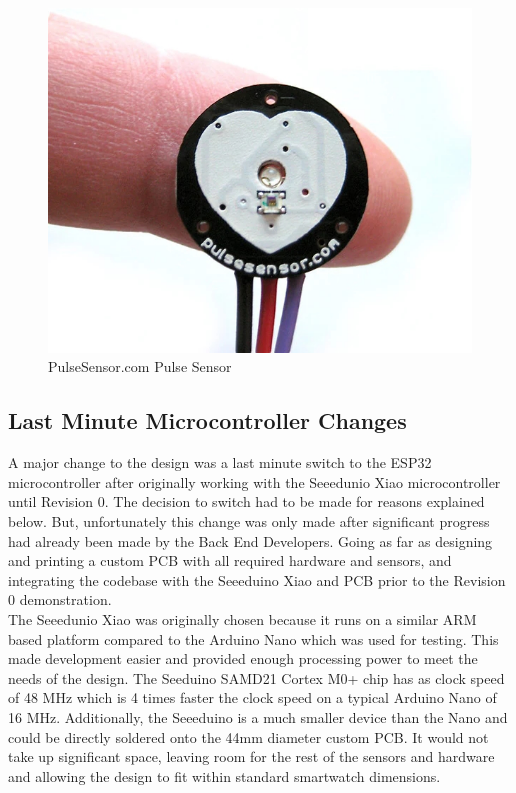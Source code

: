 \documentclass[12pt, titlepage]{article}
\begin{document}
\begin{figure}[H]
\centering
\includegraphics[scale = 0.5]{pulseSensor}
  \caption{PulseSensor.com Pulse Sensor}
  \label{fig:pulseSensor}
\end{figure}


\subsection{Last Minute Microcontroller Changes}\label{microcontroller_change}

A major change to the design was a last minute switch to the ESP32 microcontroller after originally working with the Seeedunio Xiao microcontroller until Revision 0. The decision to switch had to be made for reasons explained below. But, unfortunately this change was only made after significant progress had already been made by the Back End Developers. Going as far as designing and printing a custom PCB with all required hardware and sensors, and integrating the codebase with the Seeeduino Xiao and PCB prior to the Revision 0 demonstration. \\

The Seeedunio Xiao was originally chosen because it runs on a similar ARM based platform compared to the Arduino Nano which was used for testing. This made development easier and provided enough processing power to meet the needs of the design. The Seeduino SAMD21 Cortex M0+ chip has as clock speed of 48 MHz which is 4 times faster the clock speed on a typical Arduino Nano of 16 MHz. Additionally, the Seeeduino is a much smaller device than the Nano and could be directly soldered onto the 44mm diameter custom PCB. It would not take up significant space, leaving room for the rest of the sensors and hardware and allowing the design to fit within standard smartwatch dimensions. \\
\end{document}
